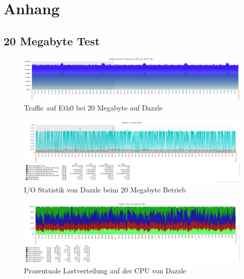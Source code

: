 \chapter{Anhang}
\label{cha:anhang}

\section{20 Megabyte Test}

\begin{figure}[htbp]
\centering
\includegraphics*[width=1\linewidth,angle=90 ]{Abb/Zabbix/Auswahl005}

\caption{Traffic auf Eth0 bei 20 Megabyte auf Dazzle}
\label{fig:Eth0DazzleStandard}
\end{figure}


\begin{figure}[htbp]
\centering
\includegraphics*[width=0.9\linewidth, angle=90]{Abb/ZabbixDazzle/Standard/IoStatStandard20}

\caption{I/O Statistik von Dazzle beim 20 Megabyte Betrieb}
\label{fig:IoStatDazzleStandard}
\end{figure} %

\begin{figure}[htbp]
\centering
\includegraphics*[width=0.9\linewidth, angle=90]{Abb/ZabbixDazzle/Standard/CPUStandard20}

\caption{Prozentuale Lastverteilung auf der CPU von Dazzle}
\label{fig:CPUDazzleStandard}
\end{figure}

